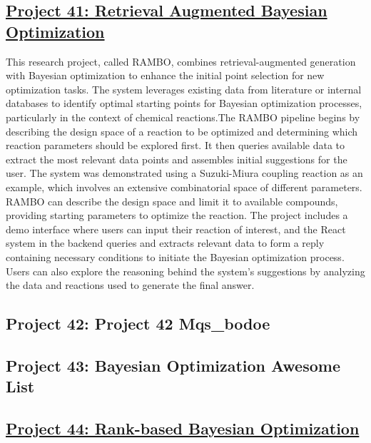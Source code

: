  \subsection*{\href{https://x.com/6ojaHa/status/1773734082637095155}{Project 41: Retrieval Augmented Bayesian Optimization}}

This research project, called RAMBO, combines retrieval-augmented generation with Bayesian optimization to enhance the initial point selection for new optimization tasks. The system leverages existing data from literature or internal databases to identify optimal starting points for Bayesian optimization processes, particularly in the context of chemical reactions.The RAMBO pipeline begins by describing the design space of a reaction to be optimized and determining which reaction parameters should be explored first. It then queries available data to extract the most relevant data points and assembles initial suggestions for the user. The system was demonstrated using a Suzuki-Miura coupling reaction as an example, which involves an extensive combinatorial space of different parameters. RAMBO can describe the design space and limit it to available compounds, providing starting parameters to optimize the reaction. The project includes a demo interface where users can input their reaction of interest, and the React system in the backend queries and extracts relevant data to form a reply containing necessary conditions to initiate the Bayesian optimization process. Users can also explore the reasoning behind the system's suggestions by analyzing the data and reactions used to generate the final answer.
 \subsection*{Project 42: Project 42 Mqs_bodoe}


 \subsection*{Project 43: Bayesian Optimization Awesome List}


 \subsection*{\href{https://www.youtube.com/watch?v=c84Sd2IwMAQ&ab_channel=GaryTom}{Project 44: Rank-based Bayesian Optimization}}

